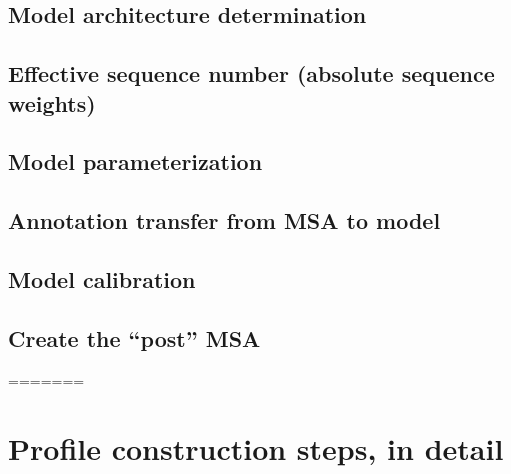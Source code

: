 \subsection{Model architecture determination}

\subsection{Effective sequence number (absolute sequence weights)}

\subsection{Model parameterization}

\subsection{Annotation transfer from MSA to model}

\subsection{Model calibration}

\subsection{Create the ``post'' MSA}















=======
\section{Profile construction steps, in detail}
\label{section:pipeline}
\setcounter{footnote}{0}

